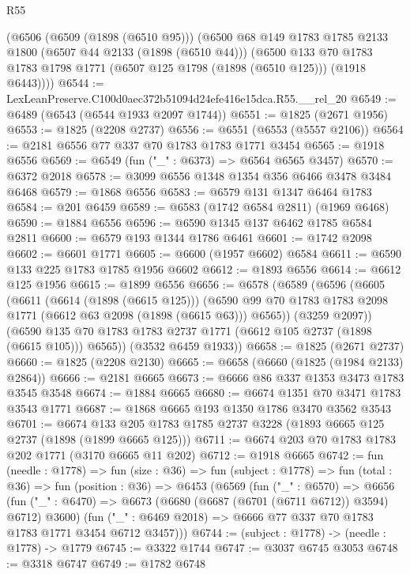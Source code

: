 \begin{lexlean}{R55}
\begin{coremodule}
    (@6506
      (@6509 (@1898 (@6510 @95)))
      (@6500
        @68
        @149
        @1783
        @1785
        @2133
        @1800
        (@6507 @44 @2133 (@1898 (@6510 @44)))
        (@6500
          @133
          @70
          @1783
          @1783
          @1798
          @1771
          (@6507 @125 @1798 (@1898 (@6510 @125)))
          (@1918 @6443))))
@6544 := LexLeanPreserve.C100d0aec372b51094d24efe416e15dca.R55.__rel_20
@6549 := @6489 (@6543 (@6544 @1933 @2097 @1744))
@6551 := @1825 (@2671 @1956)
@6553 := @1825 (@2208 @2737)
@6556 := @6551 (@6553 (@5557 @2106))
@6564 := @2181 @6556 @77 @337 @70 @1783 @1783 @1771 @3454
@6565 := @1918 @6556
@6569 := @6549 (fun ("_" : @6373) => @6564 @6565 @3457)
@6570 := @6372 @2018
@6578 := @3099 @6556 @1348 @1354 @356 @6466 @3478 @3484 @6468
@6579 := @1868 @6556
@6583 := @6579 @131 @1347 @6464 @1783
@6584 := @201 @6459
@6589 := @6583 (@1742 @6584 @2811) (@1969 @6468)
@6590 := @1884 @6556
@6596 := @6590 @1345 @137 @6462 @1785 @6584 @2811
@6600 := @6579 @193 @1344 @1786 @6461
@6601 := @1742 @2098
@6602 := @6601 @1771
@6605 := @6600 (@1957 @6602) @6584
@6611 := @6590 @133 @225 @1783 @1785 @1956 @6602
@6612 := @1893 @6556
@6614 := @6612 @125 @1956
@6615 := @1899 @6556
@6656 := @6578
    (@6589
      (@6596
        (@6605
          (@6611
            (@6614 (@1898 (@6615 @125)))
            (@6590 @99 @70 @1783 @1783 @2098 @1771 (@6612 @63 @2098 (@1898 (@6615 @63))) @6565))
          (@3259 @2097))
        (@6590 @135 @70 @1783 @1783 @2737 @1771 (@6612 @105 @2737 (@1898 (@6615 @105))) @6565))
      (@3532 @6459 @1933))
@6658 := @1825 (@2671 @2737)
@6660 := @1825 (@2208 @2130)
@6665 := @6658 (@6660 (@1825 (@1984 @2133) @2864))
@6666 := @2181 @6665
@6673 := @6666 @86 @337 @1353 @3473 @1783 @3545 @3548
@6674 := @1884 @6665
@6680 := @6674 @1351 @70 @3471 @1783 @3543 @1771
@6687 := @1868 @6665 @193 @1350 @1786 @3470 @3562 @3543
@6701 := @6674 @133 @205 @1783 @1785 @2737 @3228 (@1893 @6665 @125 @2737 (@1898 (@1899 @6665 @125)))
@6711 := @6674 @203 @70 @1783 @1783 @202 @1771 (@3170 @6665 @11 @202)
@6712 := @1918 @6665
@6742 := fun (needle : @1778) =>
  fun (size : @36) =>
  fun (subject : @1778) =>
  fun (total : @36) =>
  fun (position : @36) =>
  @6453
    (@6569
      (fun ("_" : @6570) =>
      @6656
        (fun ("_" : @6470) => @6673 (@6680 (@6687 (@6701 (@6711 @6712)) @3594) @6712) @3600)
        (fun ("_" : @6469 @2018) => @6666 @77 @337 @70 @1783 @1783 @1771 @3454 @6712 @3457)))
@6744 := (subject : @1778) -> (needle : @1778) -> @1779
@6745 := @3322 @1744
@6747 := @3037 @6745 @3053
@6748 := @3318 @6747
@6749 := @1782 @6748

\end{coremodule}
\end{lexlean}
